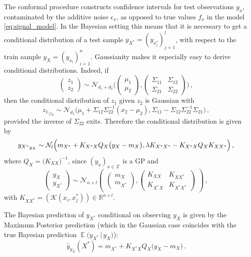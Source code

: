 \documentclass[a4paper,14pt]{article}
\newcommand{\ex}{\mathop{\mathbb{E}}\nolimits}
\newcommand{\Ncal}{\mathcal{N}}
\newcommand{\Kcal}{\mathcal{K}}
\newcommand{\Xcal}{\mathcal{X}}
\newcommand{\Real}{\mathbb{R}}
\begin{document}
The conformal procedure constructs confidence intervals for test observations $y_x$,
contaminated by the additive noise $\epsilon_x$, as opposed to true values $f_x$ in
the model \ref{eq:signal_model}. In the Bayesian setting this means that it is necessary
to get a conditional distribution of a test sample $y_{X^*} = (y_{x^*_j})_{j=1}^l$,
with respect to the train sample $y_X = (y_{x_i})_{i=1}^n$. Gaussianity makes it
especially easy to derive conditional distributions. Indeed, if
$$ \begin{pmatrix}z_1 \\ z_2\end{pmatrix}
  \sim \Ncal_{d_1+d_2}\Biggl(
    \begin{pmatrix} \mu_1 \\ \mu_2 \end{pmatrix},
    \begin{pmatrix}
      \Sigma_{11} & \Sigma_{12} \\
      \Sigma_{21} & \Sigma_{22}
    \end{pmatrix}
  \Biggr)
  \,,$$
then the conditional distribution of $z_1$ given $z_2$ is Gaussian with 
$$ {z_1}_{|z_2}
  \sim \Ncal_{d_1}\bigl(
    \mu_1 + \Sigma_{12}\Sigma_{22}^{-1}(x_2-\mu_2),
    \Sigma_{11} - \Sigma_{12}\Sigma_{22}^{-1}\Sigma_{21}
  \bigr) \,,$$
provided the inverse of $\Sigma_{22}$ exits. Therefore the conditional distribution
is given by
$$ {y_{X^*}}_{y_X}
  \sim \Ncal_l\Bigl(
    m_{X^*} + K_{X^*X} Q_X \bigl(y_X - m_X\bigr),
    \lambda K_{X^*X^*} - K_{X^*X} Q_X K_{XX^*}
  \Bigr) \,, $$
where $Q_X = \bigl(K_{XX}\bigr)^{-1}$, since $(y_x)_{x\in\Xcal}$ is a GP and
$$ \begin{pmatrix} y_X \\ y_{X^*} \end{pmatrix}
  \sim \Ncal_{n+l}\begin{pmatrix}
    \begin{pmatrix} m_X \\ m_{X^*} \end{pmatrix},
    \begin{pmatrix}
      K_{XX} & K_{XX^*} \\
      K_{X^*X} & K_{X^*X^*}
    \end{pmatrix}
  \end{pmatrix}
  \,, $$
with $K_{XX^*} = (\Kcal(x_i, x^*_j))\in \Real^{n\times l}$.

The Bayesian prediction of $y_{X^*}$ conditional on observing $y_X$ is given by
the Maximum Posterior prediction (which in the Gaussian case coincides with the
true Bayesian prediction $\ex\bigl(y_{X^*}\,|\, y_X\bigr)$):
$$ \hat{y}_{y_X}(X^*) = m_{X^*} + K_{X^*X} Q_X \bigl(y_X - m_X\bigr) \,. $$
\end{document}
